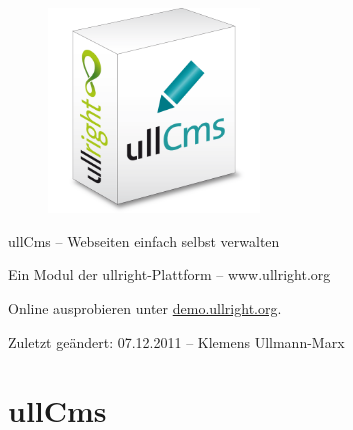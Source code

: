 \documentclass[article, a4paper, oneside, 11pt]{memoir}
\begin{document}
\vspace*{3cm}
\begin{figure}[htp]
\centering
\includegraphics[width=0.5\textwidth]{softwarebox}
\end{figure}

\vspace{3cm}

{%
\huge
\color{ullblue}
ullCms -- Webseiten einfach selbst verwalten
}

\vspace{0.2cm}

{%
\large
Ein Modul der ullright-Plattform -- www.ullright.org
}

\vspace{2.5cm}

{%
\footnotesize
Online ausprobieren unter \href{http://demo.ullright.org}{demo.ullright.org}. 

Zuletzt geändert: 07.12.2011 -- Klemens Ullmann-Marx
}

\clearpage

\pagestyle{plain}


\setcounter{secnumdepth}{2}
\setcounter{tocdepth}{2}
\tableofcontents*

\clearpage

\addtocounter{chapter}{1}

\chapter*{ullCms}
\end{document}

